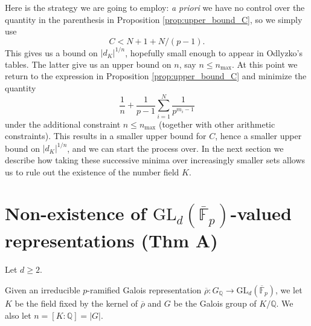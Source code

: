 \documentclass{amsart}
\theoremstyle{definition}
\newcommand{\lra}{\longrightarrow}
\newcommand{\Q}{\mathbb{Q}}
\newcommand{\F}{\mathbb{F}}
\newcommand{\bF}{\overline{\F}}
\newcommand{\br}{\overline{\rho}}
\newcommand{\GL}{\mathrm{GL}}
\renewcommand{\geq}{\geqslant}
\renewcommand{\leq}{\leqslant}
\begin{document}
Here is the strategy we are going to employ: \emph{a priori} we have no control over the quantity in the parenthesis in Proposition \ref{prop:upper_bound_C}, so we simply use
\begin{equation*}
  C<N+1+N/(p-1).
\end{equation*}
This gives us a bound on $|d_K|^{1/n}$, hopefully small enough to appear in Odlyzko's tables.
The latter give us an upper bound on $n$, say $n\leq n_{\text{max}}$.
At this point we return to the expression in Proposition \ref{prop:upper_bound_C} and minimize the quantity
\begin{equation*}
  \frac{1}{n}+\frac{1}{p-1}\sum_{i=1}^N \frac{1}{p^{m_i-1}}
\end{equation*}
under the additional constraint $n\leq n_{\text{max}}$ (together with other arithmetic constraints).
This results in a smaller upper bound for $C$, hence a smaller upper bound on $|d_K|^{1/n}$, and we can start the process over.
In the next section we describe how taking these successive minima over increasingly smaller sets allows us to rule out the existence of the number field $K$.


\section{Non-existence of \texorpdfstring{$\GL_d(\bF_p)$}{GLdFpbar}-valued representations (Thm A)}\label{gld}

Let $d\geq 2$.

Given an irreducible $p$-ramified Galois representation $\br:G_\Q\lra \GL_d(\bF_p)$, we let $K$ be the field fixed by the kernel of $\br$ and $G$ be the Galois group of $K/\Q$.
We also let $n=[K:\Q]=|G|$.
\end{document}
